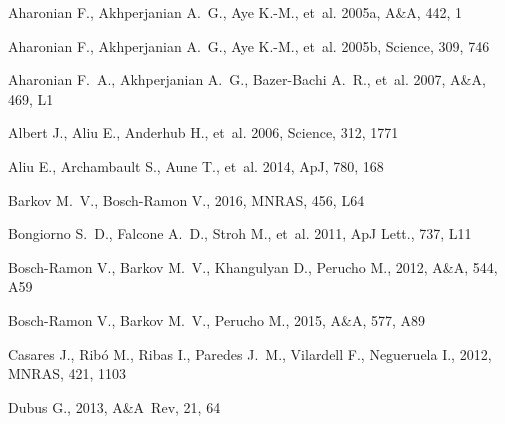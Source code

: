 \documentclass[usenatbib]{mn2e}
\newcommand{\mnras}{MNRAS}
\newcommand{\apj}{ApJ}
\newcommand{\apjl}{ApJ Lett.}
\newcommand{\aap}{A\&A}
\begin{document}
\begin{thebibliography}{}

{Aharonian} F.,  {Akhperjanian} A.~G.,  {Aye} K.-M.,    {et~al.} 2005a, \aap,
  442, 1

{Aharonian} F.,  {Akhperjanian} A.~G.,  {Aye} K.-M.,    {et~al.} 2005b,
  Science, 309, 746

{Aharonian} F.~A.,  {Akhperjanian} A.~G.,  {Bazer-Bachi} A.~R.,    {et~al.}
  2007, \aap, 469, L1

{Albert} J.,  {Aliu} E.,  {Anderhub} H.,    {et~al.} 2006, Science, 312, 1771

{Aliu} E.,  {Archambault} S.,  {Aune} T.,    {et~al.} 2014, \apj, 780, 168

{Barkov} M.~V.,  {Bosch-Ramon} V.,  2016, \mnras, 456, L64

{Bongiorno} S.~D.,  {Falcone} A.~D.,  {Stroh} M.,    {et~al.} 2011, \apjl, 737,
  L11

{Bosch-Ramon} V.,  {Barkov} M.~V.,  {Khangulyan} D.,    {Perucho} M.,  2012,
  \aap, 544, A59

{Bosch-Ramon} V.,  {Barkov} M.~V.,    {Perucho} M.,  2015, \aap, 577, A89

{Casares} J.,  {Rib{\'o}} M.,  {Ribas} I.,  {Paredes} J.~M.,  {Vilardell} F.,
   {Negueruela} I.,  2012, \mnras, 421, 1103

{Dubus} G.,  2013, A\&A~Rev, 21, 64


\end{thebibliography}
\end{document}
